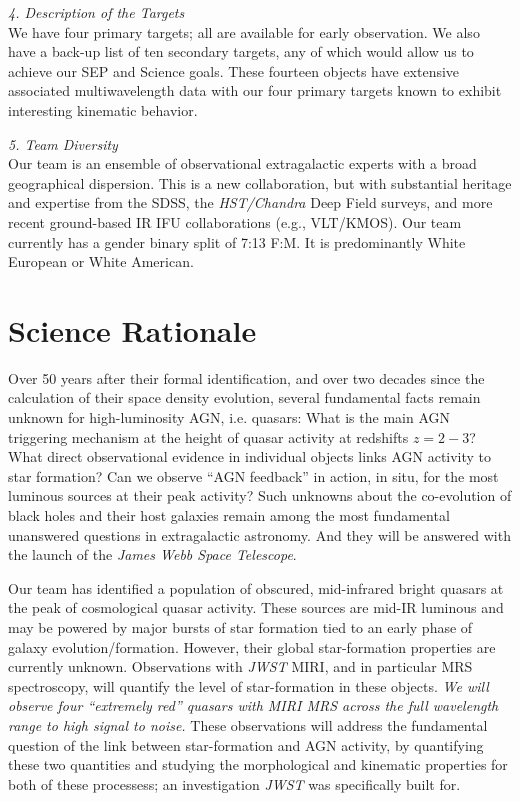 \smallskip 
\smallskip \smallskip
\noindent
{\it 4. Description of the Targets}\\
We have four primary targets; all are available for early observation.
We also have a back-up list of ten secondary targets, any of which
would allow us to achieve our SEP and Science goals. These fourteen
objects have extensive associated multiwavelength data with our four
primary targets known to exhibit interesting kinematic behavior.


\smallskip 
\smallskip \smallskip
\noindent
{\it 5. Team Diversity}\\
Our team is an ensemble of observational extragalactic experts with a
broad geographical dispersion. This is a new collaboration, but with
substantial heritage and expertise from the SDSS, the {\it
HST/Chandra} Deep Field surveys, and more recent ground-based IR IFU
collaborations (e.g., VLT/KMOS).  Our team currently has a gender binary split
of 7:13 F:M. It is predominantly White European or White American.

\section*{Science Rationale}
\vspace{-6pt}
\noindent
Over 50 years after their formal identification, and over two decades
since the calculation of their space density evolution, several
fundamental facts remain unknown for high-luminosity AGN,
i.e. quasars: What is the main AGN triggering mechanism at the height
of quasar activity at redshifts $z=2-3$? What direct observational
evidence in individual objects links AGN activity to star formation?
Can we observe ``AGN feedback'' in action, in situ, for the most
luminous sources at their peak activity?  Such unknowns about the
co-evolution of black holes and their host galaxies remain among the
most fundamental unanswered questions in extragalactic astronomy.  And
they will be answered with the launch of the {\it James Webb Space
Telescope}.

\smallskip \smallskip
\noindent
Our team has identified a population of obscured, mid-infrared bright
quasars at the peak of cosmological quasar activity.  These sources
are mid-IR luminous and may be powered by major bursts of star
formation tied to an early phase of galaxy
evolution/formation. However, their global star-formation properties
are currently unknown.  Observations with {\it JWST} MIRI, and in
particular MRS spectroscopy, will quantify the level of star-formation
in these objects.  {\it We will observe four ``extremely red'' quasars
with MIRI MRS across the full wavelength range to high signal to
noise.} These observations will address the fundamental question of
the link between star-formation and AGN activity, by quantifying these
two quantities and studying the morphological and kinematic properties
for both of these processess; an investigation {\it JWST} was
specifically built for.


